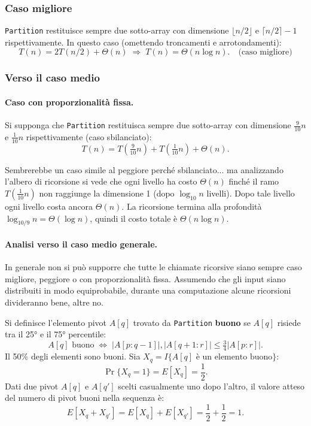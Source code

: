 \subsubsection{Caso migliore}

\texttt{Partition} restituisce sempre due sotto-array con dimensione
$\lfloor n/2 \rfloor$ e $\lceil n/2 \rceil - 1$ rispettivamente.
In questo caso (omettendo troncamenti e arrotondamenti):
\[
T(n) = 2T(n/2) + \Theta(n) \;\Rightarrow\; T(n) = \Theta(n \log n).
\quad \text{(caso migliore)}
\]

\subsubsection{Verso il caso medio}

\paragraph{Caso con proporzionalità fissa.}
Si supponga che \texttt{Partition} restituisca sempre due sotto-array
con dimensione $\frac{9}{10}n$ e $\frac{1}{10}n$ rispettivamente
(caso sbilanciato):
\[
T(n) = T\!\left(\tfrac{9}{10}n\right) + T\!\left(\tfrac{1}{10}n\right)
+ \Theta(n).
\]

\begin{softnote}
	Sembrerebbe un caso simile al peggiore perché sbilanciato... ma
	analizzando l'albero di ricorsione si vede che ogni livello ha
	costo $\Theta(n)$ finché il ramo $T(\frac{1}{10}n)$ non
	raggiunge la dimensione 1 (dopo $\log_{10} n$ livelli). Dopo tale
	livello ogni livello costa ancora $\Theta(n)$. La ricorsione termina
	alla profondità $\log_{10/9} n = \Theta(\log n)$, quindi il costo
	totale è $\Theta(n \log n)$.
\end{softnote}

\paragraph{Analisi verso il caso medio generale.}
In generale non si può supporre che tutte le chiamate ricorsive
siano sempre caso migliore, peggiore o con proporzionalità fissa.
Assumendo che gli input siano distribuiti in modo equiprobabile,
durante una computazione alcune ricorsioni divideranno bene,
altre no.

Si definisce l'elemento pivot $A[q]$ trovato da \texttt{Partition}
\textbf{buono} se $A[q]$ risiede tra il 25° e il 75° percentile:
\[
A[q] \text{ buono} \;\Leftrightarrow\;
|A[p:q-1]|, |A[q+1:r]| \le \tfrac{3}{4}|A[p:r]|.
\]
Il 50\% degli elementi sono buoni. Sia $X_q = I\{A[q]
\text{ è un elemento buono}\}$:
\[
\Pr\{X_q = 1\} = E[X_q] = \frac{1}{2}.
\]
Dati due pivot $A[q]$ e $A[q']$ scelti casualmente uno dopo l'altro,
il valore atteso del numero di pivot buoni nella sequenza è:
\[
E[X_q + X_{q'}] = E[X_q] + E[X_{q'}] = \frac{1}{2} + \frac{1}{2} = 1.
\]

